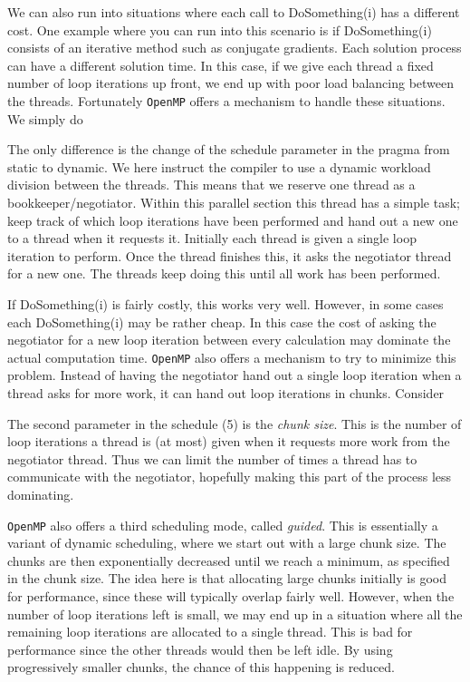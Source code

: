 \documentclass[twoside, 11pt, a4paper]{article}
\begin{document}
We can also run into situations where each call to DoSomething(i) has a different cost.
One example where you can run into this scenario is if DoSomething(i) consists of an
iterative method such as conjugate gradients. Each solution process can have a different
solution time. In this case, if we give each thread a fixed number of loop iterations up front,
we end up with poor load balancing between the threads. Fortunately \texttt{OpenMP}
offers a mechanism to handle these situations. We simply do

The only difference is the change of the schedule parameter in the pragma from static to dynamic. 
We here instruct the compiler to use a dynamic workload division between the threads. This means 
that we reserve one thread 
as a bookkeeper/negotiator. Within this parallel section this thread has a simple task; keep
track of which loop iterations have been performed and hand out a new one to a thread when it
requests it. Initially each thread is given a single loop iteration to perform. Once the thread
finishes this, it asks the negotiator thread for a new one. The threads keep doing this until all
work has been performed.

If DoSomething(i) is fairly costly, this works very well.
However, in some cases each DoSomething(i) may be rather cheap. In this case the cost of
asking the negotiator for a new loop iteration between every calculation may dominate the actual computation time.
\texttt{OpenMP} also offers a mechanism to try to minimize this problem. Instead of having the negotiator 
hand out a single loop iteration when a thread asks for more work, it can hand out loop iterations in chunks. 
Consider

The second parameter in the schedule (5) is the \emph{chunk size}.
This is the number of loop iterations a thread is (at most) given when it requests more work from the
negotiator thread. Thus we can limit the number of times a thread has to communicate with the negotiator,
hopefully making this part of the process less dominating.

\texttt{OpenMP} also offers a third scheduling mode, called \emph{guided}. This is essentially a variant
of dynamic scheduling, where we start out with a large chunk size. The chunks are then exponentially
decreased until we reach a minimum, as specified in the chunk size. The idea here is that allocating
large chunks initially is good for performance, since these will typically overlap fairly well.
However, when the number of loop iterations left is small, we may end up in a situation where all
the remaining loop iterations are allocated to a single thread. This is bad for performance since
the other threads would then be left idle. By using progressively smaller chunks, the
chance of this happening is reduced.
\end{document}
